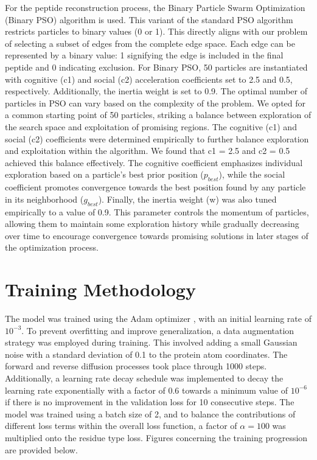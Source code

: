 For the peptide reconstruction process, the Binary Particle Swarm Optimization (Binary PSO) algorithm is used. This variant of the standard PSO algorithm restricts particles to binary values (0 or 1). This directly aligns with our problem of selecting a subset of edges from the complete edge space. Each edge can be represented by a binary value: 1 signifying the edge is included in the final peptide and 0 indicating exclusion. For Binary PSO, 50 particles are instantiated with cognitive (c1) and social (c2) acceleration coefficients set to 2.5 and 0.5, respectively. Additionally, the inertia weight is set to 0.9.
The optimal number of particles in PSO can vary based on the complexity of the problem. We opted for a common starting point of 50 particles, striking a balance between exploration of the search space and exploitation of promising regions. The cognitive (c1) and social (c2) coefficients were determined empirically to further balance exploration and exploitation within the algorithm. We found that c1 = 2.5 and c2 = 0.5 achieved this balance effectively. The cognitive coefficient emphasizes individual exploration based on a particle's best prior position ($p_{best}$), while the social coefficient promotes convergence towards the best position found by any particle in its neighborhood ($g_{best}$). Finally, the inertia weight (w) was also tuned empirically to a value of 0.9. This parameter controls the momentum of particles, allowing them to maintain some exploration history while gradually decreasing over time to encourage convergence towards promising solutions in later stages of the optimization process.

\section{Training Methodology}
The model was trained using the Adam optimizer \cite{kingma2014adam}, with an initial learning rate of $10^{-3}$. To prevent overfitting and improve generalization, a data augmentation strategy was employed during training. This involved adding a small Gaussian noise with a standard deviation of 0.1 to the protein atom coordinates. The forward and reverse diffusion processes took place through 1000 steps. Additionally, a learning rate decay schedule was implemented to decay the learning rate exponentially with a factor of 0.6 towards a minimum value of $10^{-6}$ if there is no improvement in the validation loss for 10 consecutive steps. The model was trained using a batch size of 2, and to balance the contributions of different loss terms within the overall loss function, a factor of $\alpha = 100$ was multiplied onto the residue type loss. Figures concerning the training progression are provided below. \\


